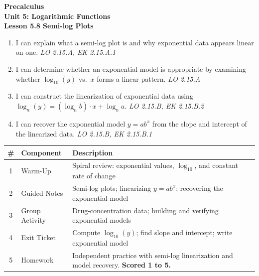 \documentclass[10pt]{article}
\begin{document}
\vspace{-0.8in}

\begin{center}
  {\color{white}\textbf{\LARGE Precalculus}}\\[4pt]
  {\color{skymid}\large\textbf{Unit 5: Logarithmic Functions}}\\[6pt]
  {\color{white}\textbf{\large Lesson 5.8 \quad Semi-log Plots}}
\end{center}

\vspace{0.22in}
\namedateperiod
\vspace{0.18in}

\begin{learningtargetbox}
\small
\begin{enumerate}[leftmargin=1.5em, itemsep=5pt]
  \item I can explain what a semi-log plot is and why exponential data appears linear on one.
        \hfill\textit{LO 2.15.A, EK 2.15.A.1}
  \item I can determine whether an exponential model is appropriate by examining whether
        $\log_{10}(y)$ vs.\ $x$ forms a linear pattern. \hfill\textit{LO 2.15.A}
  \item I can construct the linearization of exponential data using
        $\log_n(y) = (\log_n b)\cdot x + \log_n a$. \hfill\textit{LO 2.15.B, EK 2.15.B.2}
  \item I can recover the exponential model $y = ab^x$ from the slope and intercept of the
        linearized data. \hfill\textit{LO 2.15.B, EK 2.15.B.1}
\end{enumerate}
\end{learningtargetbox}

\vspace{0.14in}

\begin{tocbox}
\small
\renewcommand{\arraystretch}{1.5}
\begin{tabularx}{\linewidth}{@{} c l X @{}}
\rowcolor{sky}
\textbf{\#} & \textbf{Component} & \textbf{Description} \\
\midrule
1 & Warm-Up        & Spiral review: exponential values, $\log_{10}$, and constant rate of change \\
2 & Guided Notes   & Semi-log plots; linearizing $y = ab^x$; recovering the exponential model \\
3 & Group Activity & Drug-concentration data; building and verifying exponential models \\
4 & Exit Ticket    & Compute $\log_{10}(y)$; find slope and intercept; write exponential model \\
5 & Homework       & Independent practice with semi-log linearization and model recovery. \textbf{Scored 1 to 5.} \\
\end{tabularx}
\end{tocbox}
\end{document}
